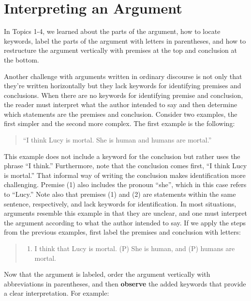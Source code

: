 \documentclass[
]{book}
\providecommand{\tightlist}{%
  \setlength{\itemsep}{0pt}\setlength{\parskip}{0pt}}
\begin{document}
\hypertarget{interpreting-an-argument}{%
\section{Interpreting an Argument}\label{interpreting-an-argument}}

In Topics 1-4, we learned about the parts of the argument, how to locate keywords, label the parts of the argument with letters in parentheses, and how to restructure the argument vertically with premises at the top and conclusion at the bottom.

Another challenge with arguments written in ordinary discourse is not only that they're written horizontally but they lack keywords for identifying premises and conclusions. When there are no keywords for identifying premise and conclusion, the reader must interpret what the author intended to say and then determine which statements are the premises and conclusion. Consider two examples, the first simpler and the second more complex. The first example is the following:

\begin{quote}
``I think Lucy is mortal. She is human and humans are mortal.''
\end{quote}

This example does not include a keyword for the conclusion but rather uses the phrase ``I think.'' Furthermore, note that the conclusion comes first, ``I think Lucy is mortal.'' That informal way of writing the conclusion makes identification more challenging. Premise (1) also includes the pronoun ``she'', which in this case refers to ``Lucy.'' Note also that premises (1) and (2) are statements within the same sentence, respectively, and lack keywords for identification. In most situations, arguments resemble this example in that they are unclear, and one must interpret the argument according to what the author intended to say. If we apply the steps from the previous examples, first label the premises and conclusion with letters:

\begin{quote}
\begin{enumerate}
\def\labelenumi{(\Alph{enumi})}
\setcounter{enumi}{2}
\tightlist
\item
  I think that Lucy is mortal. (P) She is human, and (P) humans are mortal.
\end{enumerate}
\end{quote}

Now that the argument is labeled, order the argument vertically with abbreviations in parentheses, and then \textbf{observe} the added keywords that provide a clear interpretation. For example:
\end{document}
